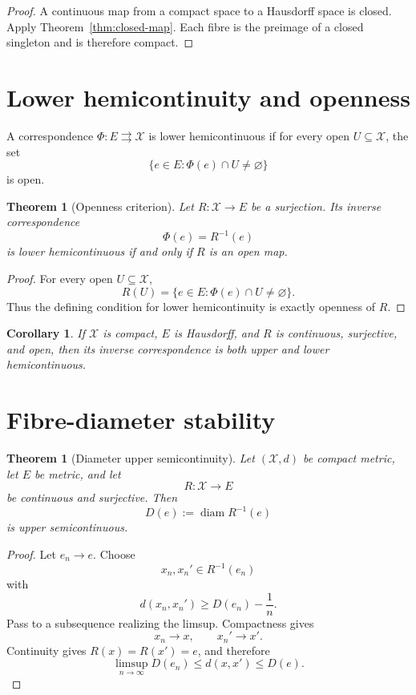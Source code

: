 \documentclass[11pt]{article}
\newtheorem{theorem}[definition]{Theorem}
\newtheorem{corollary}[definition]{Corollary}
\newcommand{\X}{\mathcal X}
\begin{document}
\begin{proof}
A continuous map from a compact space to a Hausdorff space is closed. Apply
Theorem~\ref{thm:closed-map}. Each fibre is the preimage of a closed singleton
and is therefore compact.
\end{proof}
\section{Lower hemicontinuity and openness}

A correspondence \(\Phi:E\rightrightarrows\X\) is lower hemicontinuous if for
every open \(U\subseteq\X\), the set
\[
\{e\in E:\Phi(e)\cap U\neq\varnothing\}
\]
is open.

\begin{theorem}[Openness criterion]
\label{thm:open-map}
Let \(R:\X\to E\) be a surjection. Its inverse correspondence
\[
\Phi(e)=R^{-1}(e)
\]
is lower hemicontinuous if and only if \(R\) is an open map.
\end{theorem}

\begin{proof}
For every open \(U\subseteq\X\),
\[
R(U)
=
\{e\in E:\Phi(e)\cap U\neq\varnothing\}.
\]
Thus the defining condition for lower hemicontinuity is exactly openness of
\(R\).
\end{proof}

\begin{corollary}
If \(\X\) is compact, \(E\) is Hausdorff, and \(R\) is continuous, surjective,
and open, then its inverse correspondence is both upper and lower
hemicontinuous.
\end{corollary}

\section{Fibre-diameter stability}

\begin{theorem}[Diameter upper semicontinuity]
\label{thm:diam-usc}
Let \((\X,d)\) be compact metric, let \(E\) be metric, and let
\[
R:\X\to E
\]
be continuous and surjective. Then
\[
D(e):=\operatorname{diam}R^{-1}(e)
\]
is upper semicontinuous.
\end{theorem}

\begin{proof}
Let \(e_n\to e\). Choose
\[
x_n,x_n'\in R^{-1}(e_n)
\]
with
\[
d(x_n,x_n')
\ge D(e_n)-\frac1n.
\]
Pass to a subsequence realizing the limsup. Compactness gives
\[
x_n\to x,\qquad x_n'\to x'.
\]
Continuity gives \(R(x)=R(x')=e\), and therefore
\[
\limsup_{n\to\infty}D(e_n)
\le d(x,x')
\le D(e).
\]
\end{proof}
\end{document}
